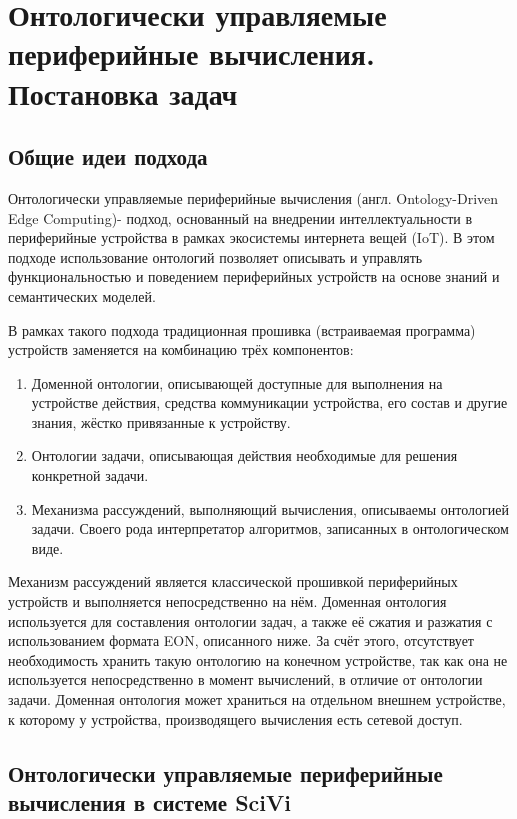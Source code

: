 \chapter{Онтологически управляемые периферийные вычисления. Постановка задач}

\section{Общие идеи подхода}

Онтологически управляемые периферийные вычисления (англ. Ontology-Driven Edge Computing)- подход, основанный на внедрении интеллектуальности в периферийные устройства в рамках экосистемы интернета вещей (IoT). 
В этом подходе использование онтологий позволяет описывать и управлять функциональностью и поведением периферийных устройств на основе знаний и семантических моделей.

В рамках такого подхода традиционная прошивка (встраиваемая программа) устройств заменяется на комбинацию трёх компонентов:
\begin{enumerate}
	\item Доменной онтологии, описывающей доступные для выполнения на устройстве действия, средства коммуникации устройства, его состав и другие знания, жёстко привязанные к устройству.
	\item Онтологии задачи, описывающая действия необходимые для решения конкретной задачи.
	\item Механизма рассуждений, выполняющий вычисления, описываемы онтологией задачи.
	Своего рода интерпретатор алгоритмов, записанных в онтологическом виде.
\end{enumerate}

Механизм рассуждений является классической прошивкой периферийных устройств и выполняется непосредственно на нём.
Доменная онтология используется для составления онтологии задач, а также её сжатия и разжатия с использованием формата EON, описанного ниже.
За счёт этого, отсутствует необходимость хранить такую онтологию на конечном устройстве, так как она не используется непосредственно в момент вычислений, в отличие от онтологии задачи.
Доменная онтология может храниться на отдельном внешнем устройстве, к которому у устройства, производящего вычисления есть сетевой доступ.

\section{Онтологически управляемые периферийные вычисления в системе SciVi}

